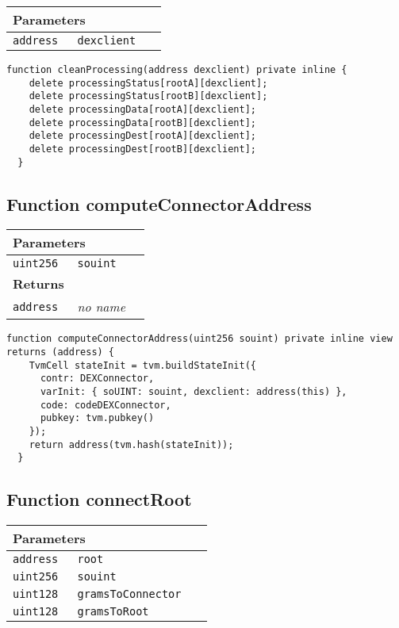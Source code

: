 \ifsoltables
\noindent\begin{tabular}{|l|l|p{5cm}|}\hline
\multicolumn{3}{|l|}{\bf Parameters}\\\hline
\tt address & \tt dexclient &\\\hline
\end{tabular}
\fi

\vspace{2cm}

\begin{lstlisting}[firstnumber=232]
  function cleanProcessing(address dexclient) private inline {
    delete processingStatus[rootA][dexclient];
    delete processingStatus[rootB][dexclient];
    delete processingData[rootA][dexclient];
    delete processingData[rootB][dexclient];
    delete processingDest[rootA][dexclient];
    delete processingDest[rootB][dexclient];
  }
\end{lstlisting}

\subsection{Function computeConnectorAddress}


\ifsoltables
\noindent\begin{tabular}{|l|l|p{5cm}|}\hline
\multicolumn{3}{|l|}{\bf Parameters}\\\hline
\tt uint256 & \tt souint &\\\hline
\multicolumn{3}{|l|}{\bf Returns}\\\hline
\tt address & {\em no name} &\\\hline
\end{tabular}
\fi

\vspace{2cm}

\begin{lstlisting}[firstnumber=95]
  function computeConnectorAddress(uint256 souint) private inline view returns (address) {
    TvmCell stateInit = tvm.buildStateInit({
      contr: DEXConnector,
      varInit: { soUINT: souint, dexclient: address(this) },
      code: codeDEXConnector,
      pubkey: tvm.pubkey()
    });
    return address(tvm.hash(stateInit));
  }
\end{lstlisting}

\subsection{Function connectRoot}


\ifsoltables
\noindent\begin{tabular}{|l|l|p{5cm}|}\hline
\multicolumn{3}{|l|}{\bf Parameters}\\\hline
\tt address & \tt root &\\\hline
\tt uint256 & \tt souint &\\\hline
\tt uint128 & \tt gramsToConnector &\\\hline
\tt uint128 & \tt gramsToRoot &\\\hline
\end{tabular}
\fi

